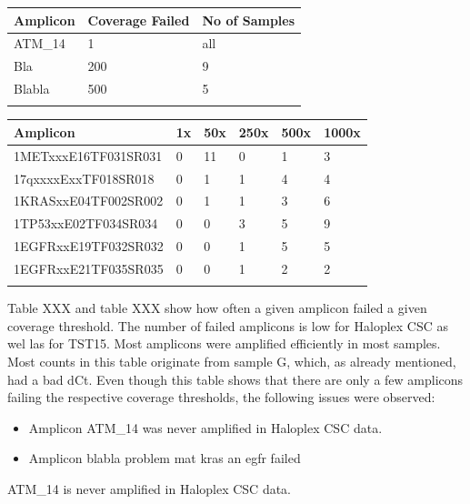 \begin{minipage}{0.5\textwidth}
\begin{tabular}{p{3cm} p{1.5cm} p{1.5cm}}\\
\hline
Amplicon & Coverage Failed & No of Samples \\
\hline
ATM\_14 & 1 & all \\
Bla & 200 & 9 \\
Blabla & 500 & 5 \\
\label{failed_hpx}
\end{tabular}
\end{minipage}
\hfill
\begin{minipage}{0.5\textwidth}
\begin{tabular}{p{3cm} p{1.5cm} p{1.5cm}}\\
\hline
Amplicon & 1x & 50x & 250x & 500x & 1000x \\
\hline
1METxxxE16TF031SR031 & 0 & 11 & 0 & 1 & 3 \\
17qxxxxExxTF018SR018 & 0 & 1 & 1 & 4 & 4 \\
1KRASxxE04TF002SR002 & 0 & 1 & 1 & 3 & 6 \\
1TP53xxE02TF034SR034 & 0 & 0 & 3 & 5 & 9 \\
1EGFRxxE19TF032SR032 & 0 & 0 & 1 & 5 & 5 \\
1EGFRxxE21TF035SR035 & 0 & 0 & 1 & 2 & 2 \\
\label{failed_tst}
\end{tabular}
\end{minipage}

Table XXX and table XXX show how often a given amplicon failed a given coverage
threshold. The number of failed amplicons is low for Haloplex CSC as wel las for TST15.
Most amplicons were amplified efficiently in most samples. Most counts in this
table originate from sample G, which, as already mentioned, had a bad dCt. Even
though this table shows that there are only a few amplicons failing the respective
coverage thresholds, the following issues were observed:
\begin{itemize}
\item Amplicon ATM\_14 was never amplified in Haloplex CSC data.
\item Amplicon blabla problem mat kras an egfr failed

\end{itemize}

ATM\_14 is never amplified in Haloplex CSC data.

